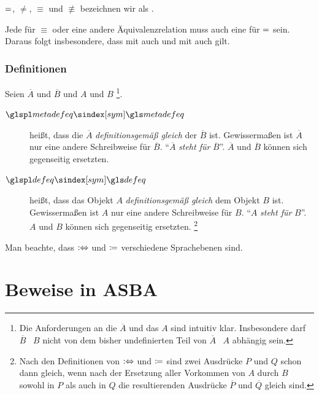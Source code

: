 $=$, $\ne$, $\equiv$ und $\nequiv$ bezeichnen wir als  .

Jede  für $\equiv$ oder eine andere Äquivalenzrelation muss auch eine für $=$ sein.
Daraus folgt insbesondere, dass mit  auch  und mit  auch  gilt.

\subsubsection{Definitionen}%
\label{subsub:Definitionen}

{
	\newcommand*{\A}{\overline{A}}
	\newcommand*{\B}{\overline{B}}
	Seien $\A$ und $\B$  und $A$ und $B$ %
	\footnote{%
		Die Anforderungen an die  $\A$ und das  $A$ sind intuitiv klar.
		Insbesondere darf $\B$ \textbzw\ $B$ nicht von dem bisher undefinierten Teil von $\A$ \textbzw\ $A$ abhängig sein.
	}.
	\begin{description}
		\item[$\glsSym{metadefeq}$~\emph{}]\label{def:Metadefinition}
		\seqqt{$\A \metadefeq \B$} heißt, dass die  $\A$ \emph{definitionsgemäß gleich} der  $\B$ ist.
		Gewissermaßen ist $\A$ nur eine andere Schreibweise für $\B$.
		\enquote{$\A$ \emph{steht für} $\B$}.
		$\A$ und $\B$ können sich gegenseitig ersetzten.
		\item[$\glsSym{defeq}$~\emph{}]\label{def:Definition}
		 heißt, dass das Objekt $A$ \emph{definitionsgemäß gleich} dem Objekt $B$ ist.
		Gewissermaßen ist $A$ nur eine andere Schreibweise für $B$.
		\enquote{$A$ \emph{steht für} $B$}.
		$A$ und $B$ können sich gegenseitig ersetzten.%
		\footnote{%
			Nach den Definitionen von $:\Leftrightarrow$ und $\coloneqq$ sind zwei Ausdrücke $P$ und $Q$ schon dann gleich, wenn nach der Ersetzung aller Vorkommen von $A$ durch $B$ sowohl in $P$ als auch in $Q$ die resultierenden Ausdrücke $\overline{P}$ und $\overline{Q}$ gleich sind.
		}

	\end{description}
	Man beachte, dass $:\Leftrightarrow$ und $\coloneqq$ verschiedene Sprachebenen sind.
}

\section{Beweise in ASBA}%
\label{sec:BeweiseASBA}


